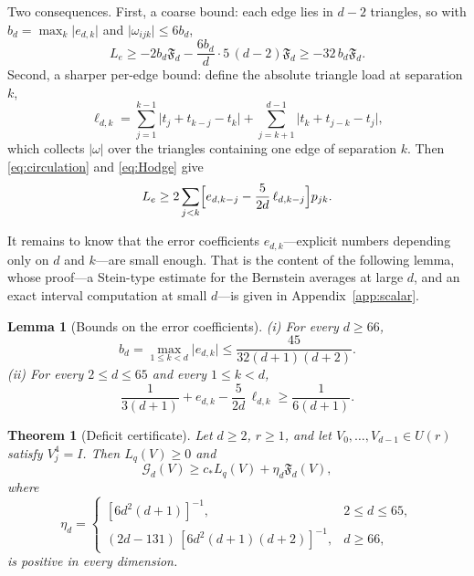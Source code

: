 \documentclass[aps,prl,reprint,superscriptaddress,longbibliography,floatfix,raggedbottom]{revtex4-2}
\newtheorem{theorem}{Theorem}
\newtheorem{lemma}{Lemma}
\newcommand{\abs}[1]{\lvert #1\rvert}
\newcommand{\cstar}{c_*}
\newcommand{\Fd}{\mathfrak F_d}
\newcommand{\Gd}{\mathcal G_d}
\begin{document}
Two consequences. First, a coarse bound: each edge lies in $d-2$
triangles, so with $b_d=\max_k\abs{e_{d,k}}$ and
$\abs{\omega_{ijk}}\le6b_d$,
\begin{equation}\label{eq:coarseerror}
L_e\ge-2b_d\Fd-\frac{6b_d}d\cdot5\,(d-2)\Fd\ge-32\,b_d\Fd .
\end{equation}
Second, a sharper per-edge bound: define the absolute triangle load at
separation $k$,
\begin{equation}\label{eq:load}
\ell_{d,k}=\sum_{j=1}^{k-1}\abs{t_j+t_{k-j}-t_k}
+\sum_{j=k+1}^{d-1}\abs{t_k+t_{j-k}-t_j},
\end{equation}
which collects $\abs{\omega}$ over the triangles containing one edge of
separation $k$. Then \eqref{eq:circulation} and \eqref{eq:Hodge} give
\begin{equation}\label{eq:fineerror}
L_e\ge2\sum_{j<k}
\Bigl[e_{d,k-j}-\frac5{2d}\,\ell_{d,k-j}\Bigr]p_{jk}.
\end{equation}

It remains to know that the error coefficients $e_{d,k}$---explicit
numbers depending only on $d$ and $k$---are small enough. That is the
content of the following lemma, whose proof---a Stein-type estimate
for the Bernstein averages at large $d$, and an exact interval
computation at small $d$---is given in Appendix~\ref{app:scalar}.

\begin{lemma}[Bounds on the error coefficients]\label{lem:scalar}
(i) For every $d\ge66$,
\begin{equation}\label{eq:largeM}
b_d=\max_{1\le k<d}\abs{e_{d,k}}
\le\frac{45}{32(d+1)(d+2)} .
\end{equation}
(ii) For every $2\le d\le65$ and every $1\le k<d$,
\begin{equation}\label{eq:finitecondition}
\frac1{3(d+1)}+e_{d,k}-\frac5{2d}\,\ell_{d,k}
\ge\frac1{6(d+1)} .
\end{equation}
\end{lemma}

\begin{theorem}[Deficit certificate]\label{thm:certificate}
Let $d\ge2$, $r\ge1$, and let $V_0,\dots,V_{d-1}\in U(r)$ satisfy
$V_j^4=I$. Then $L_q(V)\ge0$ and
\begin{equation}\label{eq:certificate}
\Gd(V)\ge\cstar L_q(V)+\eta_d\Fd(V),
\end{equation}
where
\[
\eta_d=
\begin{cases}
[6d^2(d+1)]^{-1},&2\le d\le65,\\
(2d-131)\,[6d^2(d+1)(d+2)]^{-1},&d\ge66,
\end{cases}
\]
is positive in every dimension.
\end{theorem}
\end{document}
